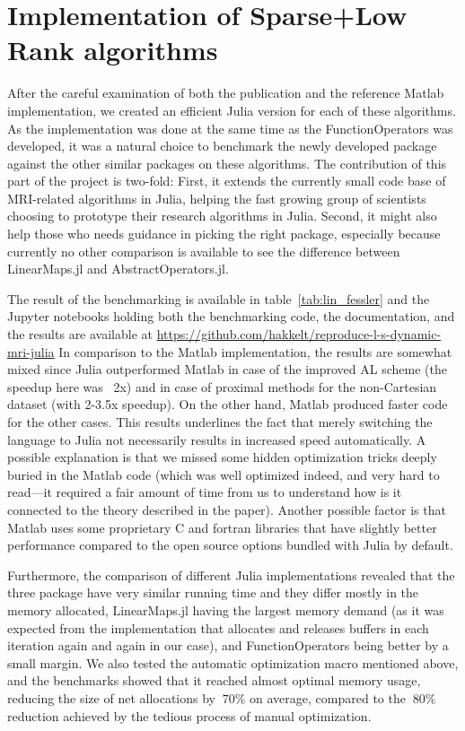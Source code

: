 \section{Implementation of Sparse+Low Rank algorithms}

After the careful examination of both the publication and the reference Matlab implementation, we created an efficient Julia version for each of these algorithms. As the implementation was done at the same time as the FunctionOperators was developed, it was a natural choice to benchmark the newly developed package against the other similar packages on these algorithms. The contribution of this part of the project is two-fold: First, it extends the currently small code base of MRI-related algorithms in Julia, helping the fast growing group of scientists choosing to prototype their research algorithms in Julia. Second, it might also help those who needs guidance in picking the right package, especially because currently no other comparison is available to see the difference between LinearMaps.jl and AbstractOperators.jl.

The result of the benchmarking is available in table~\ref{tab:lin_fessler} and the Jupyter notebooks holding both the benchmarking code, the documentation, and the results are available at \url{https://github.com/hakkelt/reproduce-l-s-dynamic-mri-julia}
In comparison to the Matlab implementation, the results are somewhat mixed since Julia outperformed Matlab in case of the improved AL scheme (the speedup here was ~2x) and in case of proximal methods for the non-Cartesian dataset (with 2-3.5x speedup). On the other hand, Matlab produced faster code for the other cases. This results underlines the fact that merely switching the language to Julia not necessarily results in increased speed automatically. A possible explanation is that we missed some hidden optimization tricks deeply buried in the Matlab code (which was well optimized indeed, and very hard to read---it required a fair amount of time from us to understand how is it connected to the theory described in the paper). Another possible factor is that Matlab uses some proprietary C and fortran libraries that have slightly better performance compared to the open source options bundled with Julia by default.

Furthermore, the comparison of different Julia implementations revealed that the three package have very similar running time and they differ mostly in the memory allocated, LinearMaps.jl having the largest memory demand (as it was expected from the implementation that allocates and releases buffers in each iteration again and again in our case), and FunctionOperators being better by a small margin. We also tested the automatic optimization macro mentioned above, and the benchmarks showed that it reached almost optimal memory usage, reducing the size of net allocations by $~70\%$ on average, compared to the $~80\%$ reduction achieved by the tedious process of manual optimization.

